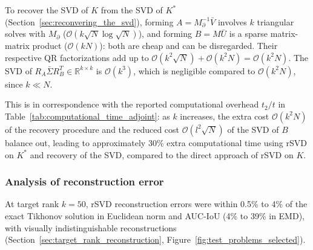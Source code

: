 To recover the SVD of $K$ from the SVD of $K^*$ (Section~\ref{sec:reconvering_the_svd}), forming $A = M_\partial^{-1} \bar V$ involves $k$ triangular solves with $M_\partial$ ($\mathcal{O}(k\sqrt{N}\log\sqrt{N})$), and forming $B = M\bar U$ is a sparse matrix-matrix product ($\mathcal{O}(kN)$): both are cheap and can be disregarded. Their respective QR factorizations add up to $\mathcal{O}(k^2 \sqrt{N}) + \mathcal{O}(k^2 N) = \mathcal{O}(k^2 N)$. The SVD of $R_A \bar \Sigma R_B^T \in \mathbb{R}^{k \times k}$ is $\mathcal{O}(k^3)$, which is negligible compared to $\mathcal{O}(k^2 N)$, since $k \ll N$.

This is in correspondence with the reported computational overhead $t_2 / t$ in Table~\ref{tab:computational_time_adjoint}: as $k$ increases, the extra cost $\mathcal{O}(k^2 N)$ of the recovery procedure and the reduced cost $\mathcal{O}(l^2 \sqrt{N})$ of the SVD of $B$ balance out, leading to approximately 30\% extra computational time using rSVD on $K^*$ and recovery of the SVD, compared to the direct approach of rSVD on $K$.


\subsubsection{Analysis of reconstruction error}\label{sec:analysis_of_reconstruction_error}
At target rank $k = 50$, rSVD reconstruction errors were within 0.5\% to 4\% of the exact Tikhonov solution in Euclidean norm and AUC-IoU (4\% to 39\% in EMD), with visually indistinguishable reconstructions (Section~\ref{sec:target_rank_reconstruction}, Figure~\ref{fig:test_problems_selected}).

